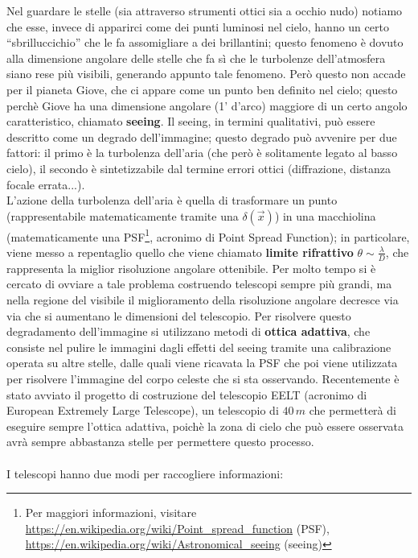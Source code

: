 Nel guardare le stelle (sia attraverso strumenti ottici sia a occhio nudo) notiamo che esse, invece di apparirci come dei punti luminosi nel cielo, hanno un certo ``sbrilluccichio'' che le fa assomigliare a dei brillantini; questo fenomeno è dovuto alla dimensione angolare delle stelle che fa sì che le turbolenze dell'atmosfera siano rese più visibili, generando appunto tale fenomeno. Però questo non accade per il pianeta Giove, che ci appare come un punto ben definito nel cielo; questo perchè Giove ha una dimensione angolare (1' d'arco) maggiore di un certo angolo caratteristico, chiamato \textbf{seeing}. Il seeing, in termini qualitativi, può essere descritto come un degrado dell'immagine; questo degrado può avvenire per due fattori: il primo è la turbolenza dell'aria (che però è solitamente legato al basso cielo), il secondo è sintetizzabile dal termine errori ottici (diffrazione, distanza focale errata...).\\
L'azione della turbolenza dell'aria è quella di trasformare un punto (rappresentabile matematicamente tramite una $\delta(\vec{x})$) in una macchiolina (matematicamente una PSF\footnote{Per maggiori informazioni, visitare \url{https://en.wikipedia.org/wiki/Point_spread_function} (PSF), \url{https://en.wikipedia.org/wiki/Astronomical_seeing} (seeing)}, acronimo di Point Spread Function); in particolare, viene messo a repentaglio quello che viene chiamato \textbf{limite rifrattivo} $\theta \sim \frac{\lambda}{D}$, che rappresenta la miglior risoluzione angolare ottenibile. Per molto tempo si è cercato di ovviare a tale problema costruendo telescopi sempre più grandi, ma nella regione del visibile il miglioramento della risoluzione angolare decresce via via che si aumentano le dimensioni del telescopio. Per risolvere questo degradamento dell'immagine si utilizzano metodi di \textbf{ottica adattiva}, che consiste nel pulire le immagini dagli effetti del seeing tramite una calibrazione operata su altre stelle, dalle quali viene ricavata la PSF che poi viene utilizzata per risolvere l'immagine del corpo celeste che si sta osservando. Recentemente è stato avviato il progetto di costruzione del telescopio EELT (acronimo di European Extremely Large Telescope), un telescopio di $40 \, m$ che permetterà di eseguire sempre l'ottica adattiva, poichè la zona di cielo che può essere osservata avrà sempre abbastanza stelle per permettere questo processo.
\\
\\
I telescopi hanno due modi per raccogliere informazioni:
